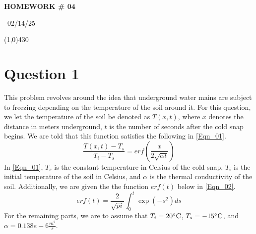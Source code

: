 \documentclass{article}
\begin{document}
\begin{center}
 \LARGE\bfseries HOMEWORK \# 04
\end{center}
\begin{center}
    ~02/14/25~
\end{center}
 \line(1,0){430}

\section{Question 1}
This problem revolves around the idea that underground water mains are subject to freezing depending on the temperature of the soil around it. For this question, we let the temperature of the soil be denoted as \(T(x,t)\), where \(x\) denotes the distance in meters underground, \(t\) is the number of seconds after the cold snap begins. We are told that this function satisfies the following in \ref{Eqn_01}.
\begin{equation}
    \label{Eqn_01}
    \frac{T(x,t)-T_s}{T_i-T_s} = erf(\frac{x}{2 \sqrt{\alpha t}})
\end{equation}
In \ref{Eqn_01}, \(T_s\) is the constant temperature in Celsius of the cold snap, \(T_i\) is the initial temperature of the soil in Celsius, and \(\alpha\) is the thermal conductivity of the soil. Additionally, we are given the the function \(erf(t)\) below in \ref{Eqn_02}.
\begin{equation}
    \label{Eqn_02}
    erf(t) = \frac{2}{\sqrt{pi}}\int_0^t\exp{(-s^2)}ds
\end{equation}
For the remaining parts, we are to assume that \(T_i = 20\degree \mbox{C}\), \(T_s = -15\degree \mbox{C}\), and \(\alpha = 0.138e-6 \frac{m^2}{s}\).
\end{document}
